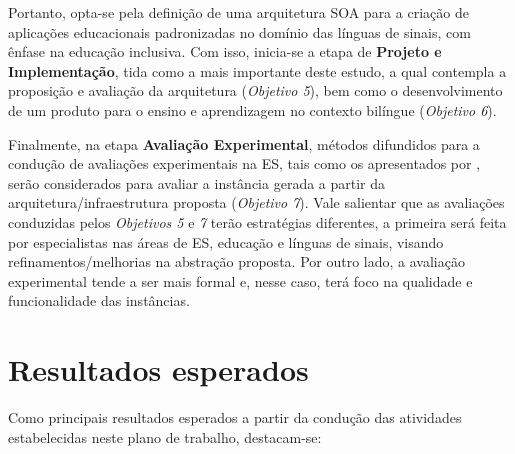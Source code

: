 Portanto, opta-se pela definição de uma arquitetura SOA para a criação de aplicações educacionais padronizadas no domínio das línguas de sinais, com ênfase na educação inclusiva. Com isso, inicia-se a etapa de \textbf{Projeto e Implementação}, tida como a mais importante deste estudo, a qual contempla a proposição e avaliação da arquitetura (\textit{Objetivo 5}), bem como o desenvolvimento de um produto para o ensino e aprendizagem no contexto bilíngue (\textit{Objetivo 6}).

Finalmente, na etapa \textbf{Avaliação Experimental}, métodos difundidos para a condução de avaliações experimentais na ES, tais como os apresentados por , serão considerados para avaliar a instância gerada a partir da arquitetura/infraestrutura proposta (\textit{Objetivo 7}). Vale salientar que as avaliações conduzidas pelos \textit{Objetivos 5} e \textit{7} terão estratégias diferentes, a primeira será feita por especialistas nas áreas de ES, educação e línguas de sinais, visando refinamentos/melhorias na abstração proposta. Por outro lado, a avaliação experimental tende a ser mais formal e, nesse caso, terá foco na qualidade e funcionalidade das instâncias.

\section{Resultados esperados}

Como principais resultados esperados a partir da condução das atividades estabelecidas neste plano de trabalho, destacam-se:

